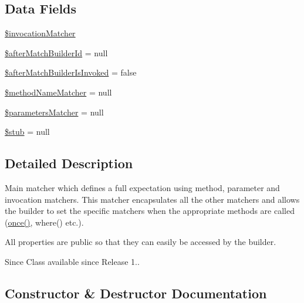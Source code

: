 \subsection*{Data Fields}
\begin{DoxyCompactItemize}
\item 
\mbox{\hyperlink{class_p_h_p_unit___framework___mock_object___matcher_a0fa42a3d09a66b637215814e7218e435}{\$invocation\+Matcher}}
\item 
\mbox{\hyperlink{class_p_h_p_unit___framework___mock_object___matcher_aad7b971a04aca4486205add7f0523e2e}{\$after\+Match\+Builder\+Id}} = null
\item 
\mbox{\hyperlink{class_p_h_p_unit___framework___mock_object___matcher_a2cf47245c7248cd61019ceca2aad29be}{\$after\+Match\+Builder\+Is\+Invoked}} = false
\item 
\mbox{\hyperlink{class_p_h_p_unit___framework___mock_object___matcher_a96a202fd31116644b195292d57e5bdc1}{\$method\+Name\+Matcher}} = null
\item 
\mbox{\hyperlink{class_p_h_p_unit___framework___mock_object___matcher_ad420a0f8242f9cb7e65412aedb2fc152}{\$parameters\+Matcher}} = null
\item 
\mbox{\hyperlink{class_p_h_p_unit___framework___mock_object___matcher_a5cfbbb065a76a67f12fef12dc6f4b0e3}{\$stub}} = null
\end{DoxyCompactItemize}


\subsection{Detailed Description}
Main matcher which defines a full expectation using method, parameter and invocation matchers. This matcher encapsulates all the other matchers and allows the builder to set the specific matchers when the appropriate methods are called (\mbox{\hyperlink{_functions_8php_adf61c548bd057a260bb851f898749157}{once()}}, where() etc.).

All properties are public so that they can easily be accessed by the builder.

\begin{DoxySince}{Since}
Class available since Release 1.. 
\end{DoxySince}


\subsection{Constructor \& Destructor Documentation}
\mbox{\label{class_p_h_p_unit___framework___mock_object___matcher_ad0ec063be7be4226ae17051b797e7c12}} 
